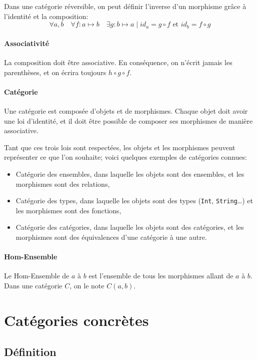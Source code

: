 \documentclass[a4paper,10pt,french,openany]{memoir}
\DeclareMathOperator\after{\circ}
\begin{document}
Dans une catégorie réversible, on peut définir l'inverse d'un morphisme grâce à l'identité et la composition:
\[ \forall a,b \quad \forall f: a \mapsto b \quad \exists g: b \mapsto a \;|\; id_a = g \after f \text{ et } id_b = f \after g \]

\paragraph{Associativité}
La composition doit être associative.
En conséquence, on n'écrit jamais les parenthèses, et on écrira toujours $h \after g \after f$.

\paragraph{Catégorie}
Une catégorie est composée d'objets et de morphismes.
Chaque objet doit avoir une loi d'identité, et il doit être possible de composer ses morphismes de manière associative.

Tant que ces trois lois sont respectées, les objets et les morphismes peuvent représenter ce que l'on souhaite; voici quelques exemples de catégories connues:
\begin{itemize}
 \item Catégorie des ensembles, dans laquelle les objets sont des ensembles, et les morphismes sont des relations,
 \item Catégorie des types, dans laquelle les objets sont des types (\lstinline{Int}, \lstinline{String}\dots) et les morphismes sont des fonctions,
 \item Catégorie des catégories, dans laquelle les objets sont des catégories, et les morphismes sont des équivalences d'une catégorie à une autre.
\end{itemize}

\paragraph{Hom-Ensemble}
Le Hom-Ensemble de $a$ à $b$ est l'ensemble de tous les morphismes allant de $a$ à $b$.
Dans une catégorie $C$, on le note $C(a, b)$.

\section{Catégories concrètes}

\subsection{Définition}
\end{document}
